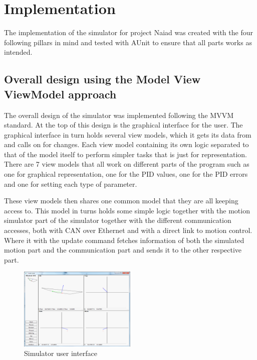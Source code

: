 \section{Implementation}\label{sec:implementation}
The implementation of the simulator for project Naiad was created with the four following pillars in mind and tested with AUnit to ensure that all parts works as intended.

\subsection{Overall design using the Model View ViewModel approach}

The overall design of the simulator was implemented following the MVVM standard. At the top of this design is the graphical interface for the user. The graphical interface in turn holds several view models, which it gets its data from and calls on for changes. Each view model containing its own logic separated to that of the model itself to perform simpler tasks that is just for representation. There are 7 view models that all work on different parts of the program such as one for graphical representation, one for the PID values, one for the PID errors and one for setting each type of parameter.

These view models then shares one common model that they are all keeping access to. This model in turns holds some simple logic together with the motion simulator part of the simulator together with the different communication accesses, both with CAN over Ethernet and with a direct link to motion control. Where it with the update command fetches information of both the simulated motion part and the communication part and sends it to the other respective part.

\begin{figure}[h]
    \includegraphics[width=0.5\textwidth]{./figure/Simulator-mod-500x350.png}
    \caption{Simulator user interface}
    \label{fig:one_column_figure}
\end{figure}

